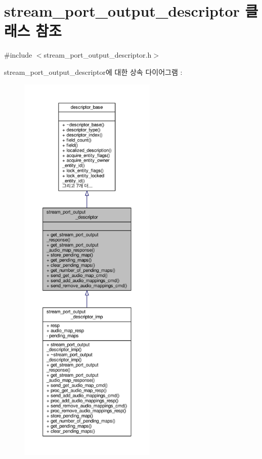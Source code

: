 \hypertarget{classavdecc__lib_1_1stream__port__output__descriptor}{}\section{stream\+\_\+port\+\_\+output\+\_\+descriptor 클래스 참조}
\label{classavdecc__lib_1_1stream__port__output__descriptor}


{\ttfamily \#include $<$stream\+\_\+port\+\_\+output\+\_\+descriptor.\+h$>$}



stream\+\_\+port\+\_\+output\+\_\+descriptor에 대한 상속 다이어그램 \+: 
\nopagebreak
\begin{figure}[H]
\begin{center}
\leavevmode
\includegraphics[height=550pt]{classavdecc__lib_1_1stream__port__output__descriptor__inherit__graph}
\end{center}
\end{figure}


